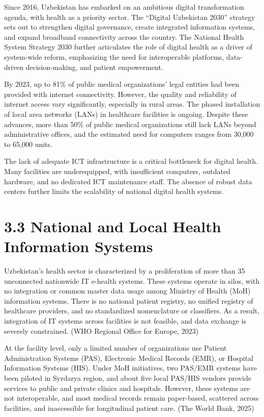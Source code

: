 Since 2016, Uzbekistan has embarked on an ambitious digital
transformation agenda, with health as a priority sector. The ``Digital
Uzbekistan 2030'' strategy sets out to strengthen digital governance,
create integrated information systems, and expand broadband connectivity
across the country. The National Health System Strategy 2030 further
articulates the role of digital health as a driver of system-wide
reform, emphasizing the need for interoperable platforms, data-driven
decision-making, and patient empowerment.

By 2023, up to 81\% of public medical organizations' legal entities had
been provided with internet connectivity. However, the quality and
reliability of internet access vary significantly, especially in rural
areas. The phased installation of local area networks (LANs) in
healthcare facilities is ongoing. Despite these advances, more than 50\%
of public medical organizations still lack LANs beyond administrative
offices, and the estimated need for computers ranges from 30,000 to
65,000 units.

The lack of adequate ICT infrastructure is a critical bottleneck for
digital health. Many facilities are underequipped, with insufficient
computers, outdated hardware, and no dedicated ICT maintenance staff.
The absence of robust data centers further limits the scalability of
national digital health systems.

\section{\texorpdfstring{\textbf{3.3 National and Local Health
Information
Systems}}{3.3 National and Local Health Information Systems}}\label{national-and-local-health-information-systems}

Uzbekistan's health sector is characterized by a proliferation of more
than 35 unconnected nationwide IT e-health systems. These systems
operate in silos, with no integration or common master data usage among
Ministry of Health (MoH) information systems. There is no national
patient registry, no unified registry of healthcare providers, and no
standardized nomenclature or classifiers. As a result, integration of IT
systems across facilities is not feasible, and data exchange is severely
constrained. (WHO Regional Office for Europe, 2023)

At the facility level, only a limited number of organizations use
Patient Administration Systems (PAS), Electronic Medical Records (EMR),
or Hospital Information Systems (HIS). Under MoH initiatives, two
PAS/EMR systems have been piloted in Syrdarya region, and about five
local PAS/HIS vendors provide services to public and private clinics and
hospitals. However, these systems are not interoperable, and most
medical records remain paper-based, scattered across facilities, and
inaccessible for longitudinal patient care. (The World Bank, 2025)

